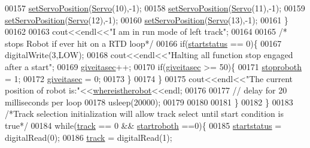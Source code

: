 \begin{DoxyCode}
00157                 \hyperlink{Servo__Position__Shell_8cpp_abd2cd3c2e36d42a2178a6f2fd12af905}{setServoPosition}(\hyperlink{Servo__Position__Shell_8h_af629c4ae98db77091b130c7fbc31cab2}{Servo}(10),-1);
00158                 \hyperlink{Servo__Position__Shell_8cpp_abd2cd3c2e36d42a2178a6f2fd12af905}{setServoPosition}(\hyperlink{Servo__Position__Shell_8h_af629c4ae98db77091b130c7fbc31cab2}{Servo}(11),-1);
00159                 \hyperlink{Servo__Position__Shell_8cpp_abd2cd3c2e36d42a2178a6f2fd12af905}{setServoPosition}(\hyperlink{Servo__Position__Shell_8h_af629c4ae98db77091b130c7fbc31cab2}{Servo}(12),-1);
00160                 \hyperlink{Servo__Position__Shell_8cpp_abd2cd3c2e36d42a2178a6f2fd12af905}{setServoPosition}(\hyperlink{Servo__Position__Shell_8h_af629c4ae98db77091b130c7fbc31cab2}{Servo}(13),-1);
00161             \}
00162             
00163             cout<<endl<<\textcolor{stringliteral}{"I am in run mode of left track"};
00164             
00165             \textcolor{comment}{/* stops Robot if ever hit on a RTD loop*/}
00166             \textcolor{keywordflow}{if}(\hyperlink{main_8cpp_a86ef28eff7b2064f6e9f34bb8371d523}{startstatus} == 0)\{
00167                 digitalWrite(3,LOW);
00168                 cout<<endl<<\textcolor{stringliteral}{"Halting all function stop engaged after a start"};
00169                 \hyperlink{main_8cpp_a7dd2d7a0998a66b7c3053f255f175382}{giveitasec}++;
00170                 \textcolor{keywordflow}{if}(\hyperlink{main_8cpp_a7dd2d7a0998a66b7c3053f255f175382}{giveitasec} >= 50)\{
00171                     \hyperlink{main_8cpp_ac941dfef463fc77cd96e79758d7d8a57}{stoproboth} = 1;
00172                     \hyperlink{main_8cpp_a7dd2d7a0998a66b7c3053f255f175382}{giveitasec} = 0;
00173                 \}
00174             \}
00175             cout<<endl<<\textcolor{stringliteral}{"The current position of robot is:"}<<\hyperlink{main_8cpp_a0828d39c90a21231f2bde12fcb178a6d}{whereistherobot}<<endl;
00176             
00177             \textcolor{comment}{// delay for 20 milliseconds per loop}
00178             usleep(20000);
00179 
00180 
00181         \}
00182     \}
00183     \textcolor{comment}{/*Track selection initialization will allow track select until start condition is true*/}
00184     \textcolor{keywordflow}{while}(\hyperlink{main_8cpp_addcde177bac7b0d7c1250ce907df0b70}{track} == 0 && \hyperlink{main_8cpp_ad9b6ac21900fa682d910b2c72a6d1a7f}{startroboth} ==0)\{
00185         \hyperlink{main_8cpp_a86ef28eff7b2064f6e9f34bb8371d523}{startstatus} = digitalRead(0);
00186         \hyperlink{main_8cpp_addcde177bac7b0d7c1250ce907df0b70}{track} = digitalRead(1);

\end{DoxyCode}
